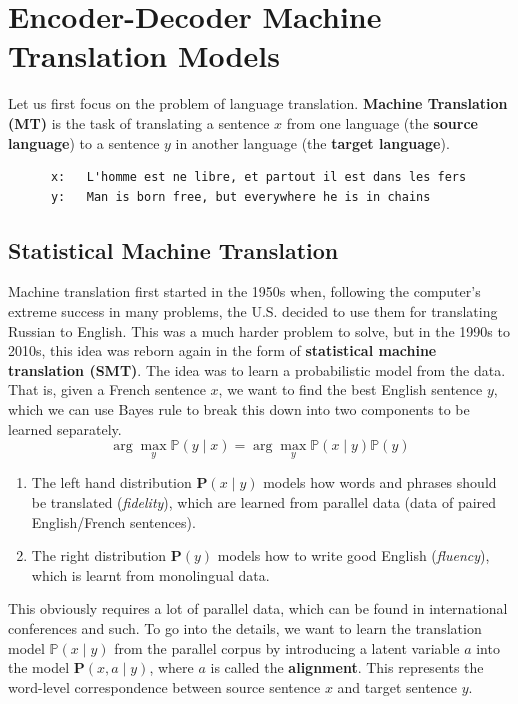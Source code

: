 \documentclass{article}
\begin{document}
\section{Encoder-Decoder Machine Translation Models}

    Let us first focus on the problem of language translation. \textbf{Machine Translation (MT)} is the task of translating a sentence $x$ from one language (the \textbf{source language}) to a sentence $y$ in another language (the \textbf{target language}). 
    \begin{lstlisting}
      x:   L'homme est ne libre, et partout il est dans les fers 
      y:   Man is born free, but everywhere he is in chains 
    \end{lstlisting}

  \subsection{Statistical Machine Translation}

    Machine translation first started in the 1950s when, following the computer's extreme success in many problems, the U.S. decided to use them for translating Russian to English. This was a much harder problem to solve, but in the 1990s to 2010s, this idea was reborn again in the form of \textbf{statistical machine translation (SMT)}. The idea was to learn a probabilistic model from the data. That is, given a French sentence $x$, we want to find the best English sentence $y$, which we can use Bayes rule to break this down into two components to be learned separately.  
    \[\arg \max_{y} \mathbb{P}(y \mid x) = \arg \max_y \mathbb{P}(x \mid y) \mathbb{P}(y) \]
    \begin{enumerate}
        \item The left hand distribution $\mathbf{P}(x \mid y)$ models how words and phrases should be translated (\textit{fidelity}), which are learned from parallel data (data of paired English/French sentences). 
        \item The right distribution $\mathbf{P}(y)$ models how to write good English (\textit{fluency}), which is learnt from monolingual data. 
    \end{enumerate}
    This obviously requires a lot of parallel data, which can be found in international conferences and such. To go into the details, we want to learn the translation model $\mathbb{P}(x \mid y)$ from the parallel corpus by introducing a latent variable $a$ into the model $\mathbf{P}(x, a \mid y)$, where $a$ is called the \textbf{alignment}. This represents the word-level correspondence between source sentence $x$ and target sentence $y$. 
\end{document}
